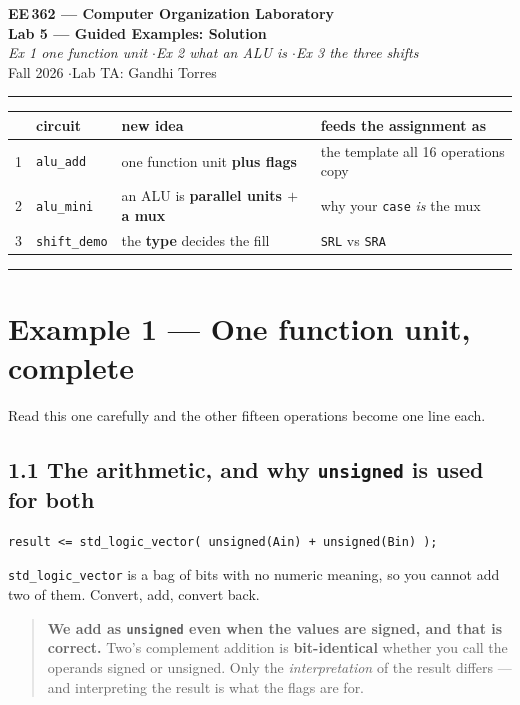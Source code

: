 \documentclass[11pt]{article}
\newcommand{\code}[1]{\texttt{#1}}
\newcommand{\hr}{\vspace{2pt}\hrule\vspace{6pt}}
\begin{document}
\begin{center}
{\Large\bfseries EE\,362 --- Computer Organization Laboratory}\\[2pt]
{\large\bfseries Lab 5 --- Guided Examples: Solution}\\[2pt]
{\itshape Ex 1 one function unit \quad$\cdot$\quad Ex 2 what an ALU is \quad$\cdot$\quad Ex 3 the three shifts}\\[4pt]
Fall 2026 \quad$\cdot$\quad Lab TA: Gandhi Torres
\end{center}
\hr

\begin{center}
\begin{tabular}{clll}
\toprule
& circuit & new idea & feeds the assignment as \\
\midrule
1 & \code{alu\_add} & one function unit \textbf{plus flags} & the template all 16 operations copy \\
2 & \code{alu\_mini} & an ALU is \textbf{parallel units $+$ a mux} & why your \code{case} \emph{is} the mux \\
3 & \code{shift\_demo} & the \textbf{type} decides the fill & \code{SRL} vs \code{SRA} \\
\bottomrule
\end{tabular}
\end{center}

\vspace{4pt}\hr

\section*{Example 1 --- One function unit, complete}

Read this one carefully and the other fifteen operations become one line each.

\subsection*{1.1 The arithmetic, and why \code{unsigned} is used for both}

\begin{lstlisting}
result <= std_logic_vector( unsigned(Ain) + unsigned(Bin) );
\end{lstlisting}

\code{std\_logic\_vector} is a bag of bits with no numeric meaning, so you cannot
add two of them. Convert, add, convert back.

\begin{quote}
\textbf{We add as \code{unsigned} even when the values are signed, and that is
correct.} Two's complement addition is \textbf{bit-identical} whether you call the
operands signed or unsigned. Only the \emph{interpretation} of the result differs
--- and interpreting the result is what the flags are for.
\end{quote}
\end{document}
